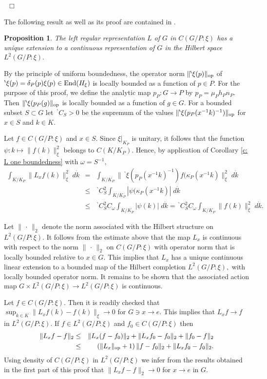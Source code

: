 \documentclass[12pt,a4paper]{article}
\newtheorem{Prop}[Thm]{Proposition}
\newenvironment{prop}[0]{\begin{Prop}\noindent}%
{\end{Prop}}
\def\proof{\par\noindent{\it Proof.}{\ }{\ }}
\def\qed{~\hfill\hbox{$\Box$}\medbreak}
\def\gd{\delta}
\def\to{\rightarrow}
\def\End{{\rm End}}
\numberwithin{Thm}{section}
\numberwithin{equation}{section}
\def\dotvar{\, \cdot\,}
\numberwithin{equation}{section}
\def\bp{\!{\,}^\backprime}
\begin{document}
 \qed

The following result as well as its proof are contained in \cite[III.7]{BWcc}.

\begin{prop}
\label{p: induced rep is cts Hilbert}
The left regular representation $L$ of $G$ in $C(G/P:\xi)$ 
has a unique extension to a continuous representation of $G$ in the Hilbert space
$L^2(G/P:\xi).$ 
\end{prop}
\proof
By the principle of uniform boundedness, the operator norm $\|\bp \xi(p)\|_{\rm op}$ of $\bp\xi(p)= 
\gd_P(p) \xi(p) \in \End(H_\xi)$ is locally bounded
as a function of $p \in P.$ 
For the purpose of this proof, we define the analytic map $p_P: G \to P$ by $p_P = \mu_P h_P n_P.$ 
Then $\|\bp \xi (p_P(g)\|_{\rm op} $ is locally bounded as a function of $g \in G.$ For a bounded subset $S \subset G$
let $\bp C_S >0$ be the supremum of the values  $\|\bp \xi(p_P(x^{-1} k)^{-1})\|_{\rm op}$ for $x \in S$ 
and $k\in K.$ 

Let $f \in C(G/P:\xi)$ and $x \in S.$ Since $\xi|_{K_P}$ is unitary, it
follows that the function $\psi: k \mapsto \|f(k)\|_\xi^2 $ belongs to $C(K/K_P).$ 
Hence, by application of Corollary \ref{c: L one boundedness} with $\omega = S^{-1},$ 
\begin{eqnarray*}
\int_{K/K_P} \|L_x f(k)\|_\xi^2\; d\dot{k}&=& 
\int_{K/K_P} \| \bp \xi(p_P(x^{-1} k)^{-1}) f(\kappa_P(x^{-1}k)\|_\xi^2\; d\dot{k} 
\\
&\leq &
\bp C_S^2 \int _{K/K_P} |\psi(\kappa_P(x^{-1}k)|\; d\dot{k} \\
&\leq & \bp C_S^2 C_{\omega} \int_{K/K_P} |\psi(k)| \;d\dot{k}
=
 \bp C_S^2 C_{\omega}  \int_{K/K_P} \|f(k)\|_\xi^2 \; d\dot{k}.
\end{eqnarray*}

Let $\|\dotvar \|_2$ denote the norm associated with the Hilbert structure on $L^2(G/P:\xi).$  
It follows from the estimate above that the map $L_x$ is continuous with respect to the norm $ \|\dotvar\|_2$ 
on $C(G/P:\xi)$  with operator norm that is locally bounded relative to $x \in G.$ 
This implies that $L_x$ has a unique continuous linear extension to a bounded 
map of the Hilbert completion $L^2(G/P:\xi),$ with locally bounded operator norm.
It remains to be shown that the 
associated action map $G \times L^2(G/P:\xi) \to L^2(G/P:\xi)$ is continuous.

Let $f \in C(G/P:\xi).$ Then it is readily checked that $\sup_{k \in K} \|L_x f(k) - f(k)\|_\xi \to 0$ 
for $G\ni x \to e.$ This implies that $L_x f\to f$ in $L^2(G/P: \xi).$ 
If $f \in L^2(G/P:\xi)$ and $f_0 \in C(G/P: \xi)$ then 
\begin{eqnarray*}
\|L_x f - f\|_2 & \leq& \|L_x (f - f_0)\|_2 + \|L_x f_0 - f_0 \|_2 + \|f_0 - f\|_2 \\
& \leq & (\|L_x\|_{\rm op} +1 )\, \|f -f_0\|_2 + \|L_x f_0 - f_0\|_2.
\end{eqnarray*}
Using density of $C(G/P:\xi)$ in $L^2(G/P:\xi)$ we infer from the results obtained in the first part of this proof  that $\|L_x f -f \|_2 \to 0$ for $x\to e$ in $G.$ 
\end{document}
